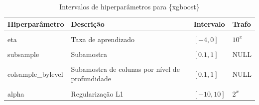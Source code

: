 \begin{apendicesenv}
\begin{table}

  \caption{\label{tab:tbl-hip-xgboost}Intervalos de hiperparâmetros para \{xgboost\}}
  \centering
  \begin{tabular}[t]{llll}
  \toprule
  Hiperparâmetro & Descrição & Intervalo & Trafo\\
  \midrule
  \cellcolor{gray!6}{nrounds} & \cellcolor{gray!6}{Número de iterações} & \cellcolor{gray!6}{$[1, 5000]$} & \cellcolor{gray!6}{NULL}\\
  eta & Taxa de aprendizado & $[-4, 0]$ & $10^x$\\
  \cellcolor{gray!6}{max\_depth} & \cellcolor{gray!6}{Profundidade máxima} & \cellcolor{gray!6}{$[1, 20]$} & \cellcolor{gray!6}{NULL}\\
  subsample & Subamostra & $[0.1, 1]$ & NULL\\
  \cellcolor{gray!6}{colsample\_bytree} & \cellcolor{gray!6}{Subamostra de colunas para uma árvore} & \cellcolor{gray!6}{$[0.1, 1]$} & \cellcolor{gray!6}{NULL}\\
  \addlinespace
  colsample\_bylevel & Subamostra de colunas por nível de profundidade & $[0.1, 1]$ & NULL\\
  \cellcolor{gray!6}{lambda} & \cellcolor{gray!6}{Regularização L2} & \cellcolor{gray!6}{$[-10, 10]$} & \cellcolor{gray!6}{$2^x$}\\
  alpha & Regularização L1 & $[-10, 10]$ & $2^x$\\
  \bottomrule
  \end{tabular}
\end{table}

\begin{table}


\end{table}
\end{apendicesenv}
